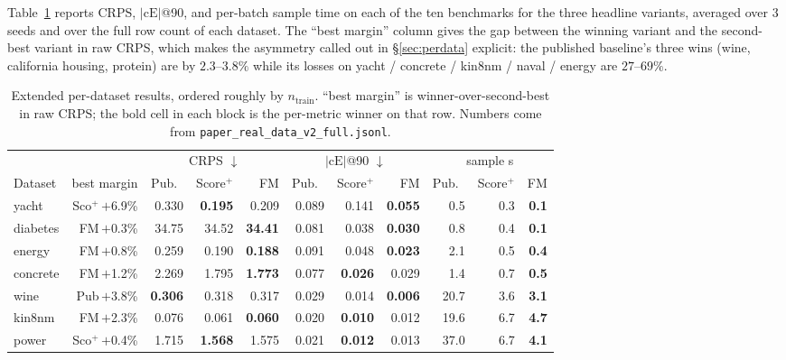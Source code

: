 \documentclass{uai2026}
\begin{document}
Table~\ref{tab:perdata-ext} reports CRPS, $|\text{cE}|$@90, and per-batch sample time on each of the ten benchmarks for the three headline variants, averaged over 3 seeds and over the full row count of each dataset. The ``best margin'' column gives the gap between the winning variant and the second-best variant in raw CRPS, which makes the asymmetry called out in \S\ref{sec:perdata} explicit: the published baseline's three wins (wine, california housing, protein) are by $2.3$--$3.8\%$ while its losses on yacht / concrete / kin8nm / naval / energy are $27$--$69\%$.

\begin{table}[!h]
  \centering
  \caption{Extended per-dataset results, ordered roughly by $n_{\text{train}}$. ``best margin'' is winner-over-second-best in raw CRPS; the bold cell in each block is the per-metric winner on that row. Numbers come from \texttt{paper\_real\_data\_v2\_full.jsonl}.}\label{tab:perdata-ext}
  \scriptsize
  \begin{tabular}{lrrrrrrrrrr}
    \toprule
    & & \multicolumn{3}{c}{CRPS $\downarrow$} & \multicolumn{3}{c}{$|\text{cE}|$@90 $\downarrow$} & \multicolumn{3}{c}{sample s} \\
    \cmidrule(lr){3-5} \cmidrule(lr){6-8} \cmidrule(lr){9-11}
    Dataset & best margin & Pub.\ & Score$^+$ & FM & Pub.\ & Score$^+$ & FM & Pub.\ & Score$^+$ & FM \\
    \midrule
    yacht              & Sco$^+$\,$+$6.9\% & 0.330 & \textbf{0.195} & 0.209 & 0.089 & 0.141 & \textbf{0.055} & 0.5 & 0.3 & \textbf{0.1} \\
    diabetes           & FM\,$+$0.3\%      & 34.75 & 34.52 & \textbf{34.41} & 0.081 & 0.038 & \textbf{0.030} & 0.8 & 0.4 & \textbf{0.1} \\
    energy             & FM\,$+$0.8\%      & 0.259 & 0.190 & \textbf{0.188} & 0.091 & 0.048 & \textbf{0.023} & 2.1 & 0.5 & \textbf{0.4} \\
    concrete           & FM\,$+$1.2\%      & 2.269 & 1.795 & \textbf{1.773} & 0.077 & \textbf{0.026} & 0.029 & 1.4 & 0.7 & \textbf{0.5} \\
    wine               & Pub\,$+$3.8\%     & \textbf{0.306} & 0.318 & 0.317 & 0.029 & 0.014 & \textbf{0.006} & 20.7 & 3.6 & \textbf{3.1} \\
    kin8nm             & FM\,$+$2.3\%      & 0.076 & 0.061 & \textbf{0.060} & 0.020 & \textbf{0.010} & 0.012 & 19.6 & 6.7 & \textbf{4.7} \\
    power              & Sco$^+$\,$+$0.4\% & 1.715 & \textbf{1.568} & 1.575 & 0.021 & \textbf{0.012} & 0.013 & 37.0 & 6.7 & \textbf{4.1} \\

\end{tabular}
\end{table}
\end{document}
